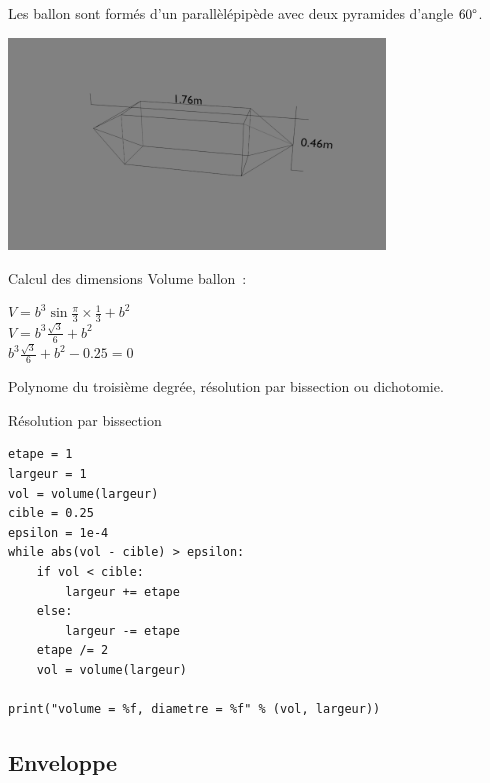 \documentclass{beamer}
\begin{document}
\begin{frame}
  Les ballon sont formés d'un parallèlépipède avec deux pyramides d'angle $60\degree$. \\
  \begin{center}
    \includegraphics[width=10cm]{../Images/ballon.png}
  \end{center}
\end{frame}

\begin{frame}{Calcul des dimensions}
  Volume ballon~:
  \begin{center}
    $\displaystyle{V = b^3 \sin \frac{\pi}{3} \times \frac{1}{3} + b^2}$ \\
    $\displaystyle{V = b^3 \frac{\sqrt{3}}{6} + b^2}$ \\
    $\displaystyle{b^3 \frac{\sqrt{3}}{6} + b^2 - 0.25 = 0}$
  \end{center}
  Polynome du troisième degrée, résolution par bissection ou dichotomie.
\end{frame}

\begin{frame}[fragile]{Résolution par bissection}
  \begin{lstlisting}[frame=single]
etape = 1
largeur = 1
vol = volume(largeur)
cible = 0.25
epsilon = 1e-4
while abs(vol - cible) > epsilon:
	if vol < cible:
		largeur += etape
	else:
		largeur -= etape
	etape /= 2
	vol = volume(largeur)

print("volume = %f, diametre = %f" % (vol, largeur))
  \end{lstlisting}
\end{frame}

\subsection{Enveloppe}
\end{document}
